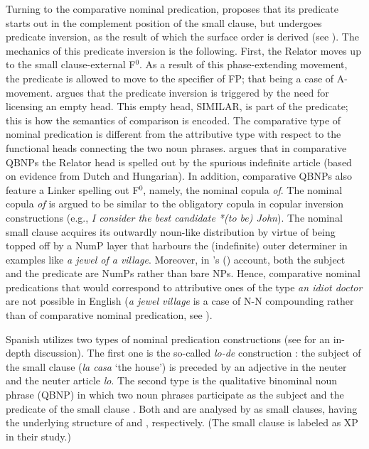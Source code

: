 \documentclass[output=paper]{langscibook}
\begin{document}
Turning to the comparative nominal predication, \citet[175--181]{denDikken2006} proposes that its predicate starts out in the complement position of the small clause, but undergoes predicate inversion, as the result of which the surface order is derived (see ). The mechanics of this predicate inversion is the following. First, the Relator moves up to the small clause-external F$^0$. As a result of this phase-extending movement, the predicate is allowed to move to the specifier of FP; that being a case of A-movement.  argues that the predicate inversion is triggered by the need for licensing an empty head. This empty head, SIMILAR, is part of the predicate; this is how the semantics of comparison is encoded. The comparative type of nominal predication is different from the attributive type with respect to the functional heads connecting the two noun phrases.  argues that in comparative QBNPs the Relator head is spelled out by the spurious indefinite article (based on evidence from Dutch and Hungarian). In addition, comparative QBNPs also feature a Linker spelling out F$^0$, namely, the nominal copula \emph{of}. The nominal copula \emph{of} is argued to be similar to the obligatory copula in copular inversion constructions (e.g., \emph{I consider the best candidate *(to be) John}). The nominal small clause acquires its outwardly noun-like distribution by virtue of being topped off by a NumP layer that harbours the (indefinite) outer determiner in examples like \emph{a jewel of a village}. Moreover, in \citeauthor{denDikken2006}'s (\citeyear{denDikken2006}) account, both the subject and the predicate are NumPs rather than bare NPs. Hence, comparative nominal predications that would correspond to attributive ones of the type \emph{an idiot doctor} are not possible in English (\emph{a jewel village} is a case of N\nobreakdash-N compounding rather than of comparative nominal predication, see \citealt[163--164, 173]{denDikken2006}).


Spanish utilizes two types of nominal predication constructions (see \citealt{VillalbaBartra-Kaufman2010} for an in-depth discussion). The first one is the so-called \emph{lo-de} construction : the subject of the small clause (\emph{la casa} `the house') is preceded by an adjective in the neuter and the neuter article \emph{lo}. The second type is the qualitative binominal noun phrase (QBNP) in which two noun phrases participate as the subject and the predicate of the small clause . Both  and  are analysed by \citet{VillalbaBartra-Kaufman2010} as small clauses, having the underlying structure of  and , respectively. (The small clause is labeled as XP in their study.) 
\end{document}
